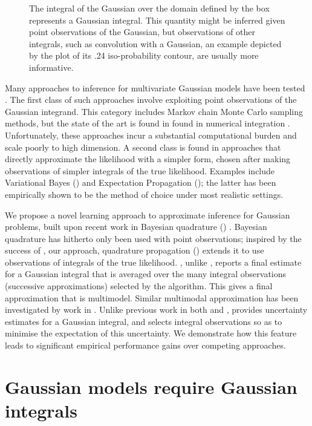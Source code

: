 \documentclass[twoside]{article}
\begin{document}
\begin{figure}
\caption{The integral of the Gaussian over the domain defined by the box represents a Gaussian integral. This quantity might be inferred given point observations of the Gaussian, but observations of other integrals, such as convolution with a Gaussian, an example depicted by the plot of its .24 iso-probability contour, are usually more informative.}
\label{fig:observations}
\end{figure}

Many approaches to inference for multivariate Gaussian models have been tested \citep{kuss2005assessing}. The first class of such approaches involve exploiting point observations of the Gaussian integrand. This category includes Markov chain Monte Carlo sampling methods, but the state of the art is found in found in numerical integration \citep{genz2009computation}. Unfortunately, these approaches incur a substantial computational burden and scale poorly to high dimension. A second class is found in approaches that directly approximate the likelihood with a simpler form, chosen after making observations of simpler integrals of the true likelihood. Examples include Variational Bayes (\vb) and Expectation Propagation \citep{minka2001expectation} (\ep); the latter has been empirically shown to be the method of choice \citep{nickisch2008approximations} under most realistic settings. 

We propose a novel learning approach to approximate inference for Gaussian problems, built upon recent work in Bayesian quadrature (\bq) \citep{osborne2012active}. Bayesian quadrature has hitherto only been used with point observations; inspired by the success of \ep, our approach, quadrature propagation (\qp) extends it to use observations of integrals of the true likelihood. \qp, unlike \ep, reports a final estimate for a Gaussian integral that is averaged over the many integral observations (successive approximations) selected by the algorithm. This gives a final approximation that is multimodel. Similar multimodal approximation has been investigated by work in \vb \citep{gershman2012nonparametric}. Unlike previous work in both \vb and \ep, \qp provides uncertainty estimates for a Gaussian integral, and selects integral observations so as to minimise the expectation of this uncertainty. We demonstrate how this feature leads \qp to significant empirical performance gains over competing approaches.

\section{Gaussian models require Gaussian integrals}
\end{document}
